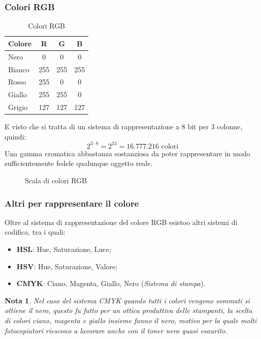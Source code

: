 \documentclass{report}
\newtheorem{nota}{Nota}
\begin{document}
\subsubsection{Colori RGB}
\label{sec:rgbcolor}
\begin{table}[ht!]
  \centering
  \begin{tabular}{lccc}
    \textbf{Colore}& \textbf{R} & \textbf{G} & \textbf{B}\\\hline
    Nero & 0 & 0 & 0\\
    Bianco & 255 & 255 & 255\\
    {\color{red}Rosso} & 255 & 0 & 0\\
    {\color{yellow}Giallo} & 255 & 255 & 0\\
    {\color{gray}Grigio} & 127 & 127 & 127\\\hline
  \end{tabular}
  \caption{Colori RGB}
  \label{tab:rgb}
\end{table}
E visto che si tratta di un sistema di rappresentazione a 8 bit per 3
colonne, quindi:
\begin{equation*}
  2^{3\cdot 8} =2^{24} = 16.777.216 \text{ colori}
\end{equation*}
Una gamma cromatica abbastanza sostanziosa da poter rappresentare in modo
sufficientemente fedele qualunque oggetto reale.
\begin{figure}[ht!]
  \centering
  \resizebox{8cm}{!}{
  }
  \caption{Scala di colori RGB}
  \label{fig:rgb}
\end{figure}
\subsubsection{Altri per rappresentare il colore}
\label{sec:altcolorr}

Oltre al sistema di rappresentazione del colore RGB esistoo altri sistemi
di codifica, tra i quali:
\begin{itemize}
\item \textbf{HSL}: Hue, Saturazione, Luce;
\item \textbf{HSV}: Hue, Saturazione, Valore;
\item \textbf{CMYK}: Ciano, Magenta, Giallo, Nero (\textit{Sistema di
    stampa}).
\end{itemize}
\begin{nota}
  Nel caso del sistema CMYK quando tutti i colori vengono sommati si
  ottiene il nero, questo fu fatto per un ottica produttiva delle
  stampanti, la scelta di colori ciano, magenta e giallo insieme
  fanno il nero, motivo per la quale molti fotocopiatori riescono
  a lavorare anche con il toner nero quasi esaurito.
\end{nota}
\end{document}
